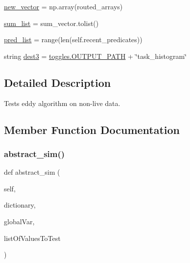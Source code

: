 \begin{DoxyCompactItemize}
\item 
\mbox{\hyperlink{classdynamicfilterapp_1_1test__simulations_1_1_simulation_test_afadfad23c54c2616cbe6bff430f72e5b}{new\+\_\+vector}} = np.\+array(routed\+\_\+arrays)
\item 
\mbox{\hyperlink{classdynamicfilterapp_1_1test__simulations_1_1_simulation_test_af26c236cdeca420e57950e94386ca3c3}{sum\+\_\+list}} = sum\+\_\+vector.\+tolist()
\item 
\mbox{\hyperlink{classdynamicfilterapp_1_1test__simulations_1_1_simulation_test_a9ecbfebeaf51a31cbe46c8ce7814e330}{pred\+\_\+list}} = range(len(self.\+recent\+\_\+predicates))
\item 
string \mbox{\hyperlink{classdynamicfilterapp_1_1test__simulations_1_1_simulation_test_a8e2377aa159f703f8480b3cdce41e396}{dest3}} = \mbox{\hyperlink{namespacedynamicfilterapp_1_1toggles_a04644ded1d5e3fc8bd58a411209b7886}{toggles.\+O\+U\+T\+P\+U\+T\+\_\+\+P\+A\+TH}} + \char`\"{}task\+\_\+histogram\char`\"{}
\end{DoxyCompactItemize}


\subsection{Detailed Description}
\begin{DoxyVerb}Tests eddy algorithm on non-live data.
\end{DoxyVerb}
 

\subsection{Member Function Documentation}
\mbox{\label{classdynamicfilterapp_1_1test__simulations_1_1_simulation_test_a9c135691a7d3f7baca5225dd869bb073}} 
\subsubsection{\texorpdfstring{abstract\+\_\+sim()}{abstract\_sim()}}
{\footnotesize\ttfamily def abstract\+\_\+sim (\begin{DoxyParamCaption}\item[{}]{self,  }\item[{}]{dictionary,  }\item[{}]{global\+Var,  }\item[{}]{list\+Of\+Values\+To\+Test }\end{DoxyParamCaption})}



